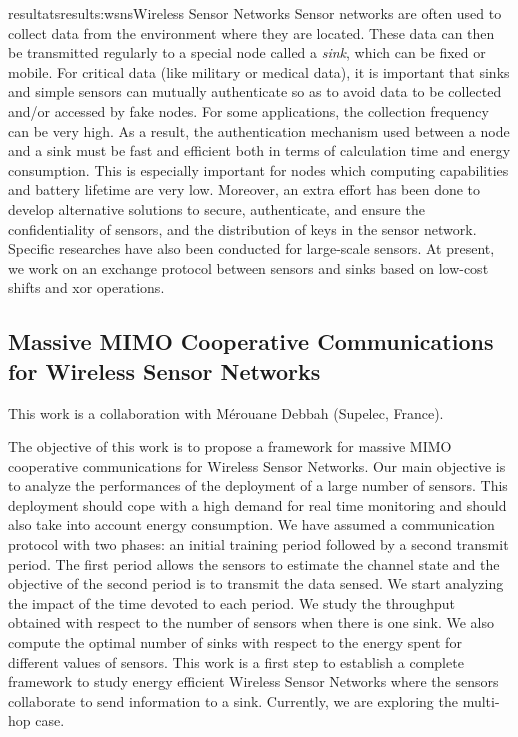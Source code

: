 \documentclass{ra2016}
\begin{document}
\begin{module}{resultats}{results:wsns}{Wireless Sensor Networks}
Sensor networks are often used to collect data from the environment where they are located. These data can then be transmitted regularly to a special node called a {\em sink}, which can be fixed or mobile. For critical data (like military or medical data), it is important that sinks and simple sensors can mutually authenticate so as to avoid data to be collected and/or accessed by fake nodes.
For some applications, the collection frequency can be very high. As a result, the authentication mechanism used between a node and a sink must be fast and efficient both in terms of calculation time and energy consumption. This is especially important for nodes which computing capabilities and battery lifetime are very low. Moreover, an extra effort has been done to develop alternative solutions to secure, authenticate, and ensure the confidentiality of sensors, and the distribution of keys in the sensor network. Specific researches have also been conducted for large-scale sensors. At present, we work on an exchange protocol between sensors and sinks based on low-cost shifts and xor operations.

\subsection{Massive MIMO Cooperative Communications for Wireless Sensor Networks}

\begin{participants}
\end{participants}

This work is a collaboration with M\'erouane Debbah (Supelec, France).

The objective of this work is to propose a framework for massive MIMO cooperative communications for Wireless Sensor Networks. Our main objective is  to analyze the performances of the deployment of a large number of sensors. This deployment should cope with a high demand for real time monitoring and should also take into account energy consumption. We have assumed a communication protocol with two phases: an initial training period followed by a second transmit period. The first period allows the sensors to estimate the channel state and the objective of the second period is to transmit the data sensed. We start analyzing the impact of the time devoted to each period. We study the throughput obtained with respect to the number of sensors when there is one sink. We also compute the optimal number of sinks with respect to the energy spent for different values of sensors. This work is a first step to establish a complete framework to study energy efficient Wireless Sensor Networks where the sensors collaborate to send information to a sink. Currently, we are exploring the multi-hop case.

\end{module}
\end{document}
